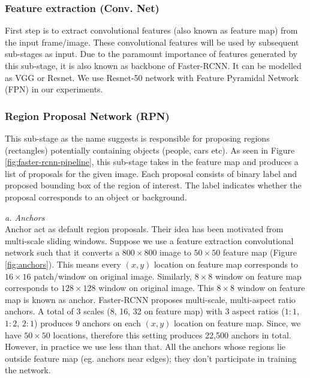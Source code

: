 \subsubsection{Feature extraction (Conv. Net)}
First step is to extract convolutional features (also known as feature map) from the input frame/image. These convolutional features will be used by subsequent sub-stages as input. Due to the paramount importance of features generated by this sub-stage, it is also known as backbone of Faster-RCNN. It can be modelled as VGG\cite{simonyan2014very} or Resnet\cite{he2016deep}. We use Resnet-50 network with Feature Pyramidal Network (FPN)\cite{lin2017feature} in our experiments. 


\subsubsection{Region Proposal Network (RPN)}
This sub-stage as the name suggests is responsible for proposing regions (rectangles) potentially containing objects (people, cars etc). As seen in Figure \ref{fig:faster-rcnn-pipeline}, this sub-stage takes in the feature map and produces a list of proposals for the given image. Each proposal consists of binary label and proposed bounding box of the region of interest. The label indicates whether the proposal corresponds to an object or background. 

\vspace{5pt}
\textit{a. Anchors}\\
Anchor act as default region proposals. Their idea has been motivated from multi-scale sliding windows. Suppose we use a feature extraction convolutional network such that it converts a $800\times800$ image to $50\times50$ feature map (Figure \ref{fig:anchors}). This means every $(x,y)$ location on feature map corresponds to $16\times16$ patch/window on original image. Similarly, $8\times8$ window on feature map corresponds to $128\times128$ window on original image. This $8\times8$ window on feature map is known as anchor. Faster-RCNN proposes multi-scale, multi-aspect ratio anchors. A total of 3 scales (8, 16, 32 on feature map) with 3 aspect ratios ($1:1$, $1:2$, $2:1$) produces 9 anchors on each $(x,y)$ location on feature map. Since, we have $50\times50$ locations, therefore this setting produces 22,500 anchors in total. However, in practice we use less than that. All the anchors whose regions lie outside feature map (eg. anchors near edges); they don't participate in training the network. 

